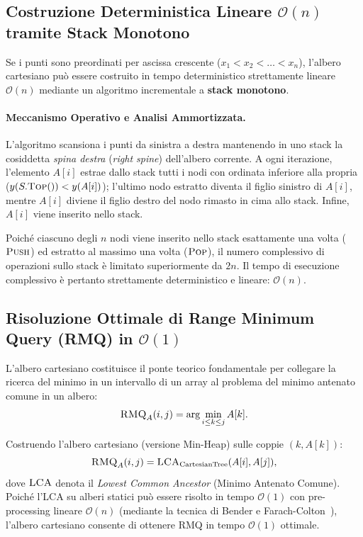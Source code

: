 \FloatBarrier
\subsection{Costruzione Deterministica Lineare $\mathcal{O}(n)$ tramite Stack Monotono}
Se i punti sono preordinati per ascissa crescente ($x_1 < x_2 < \dots < x_n$), l'albero cartesiano pu\`o essere costruito in tempo deterministico strettamente lineare $\mathcal{O}(n)$ mediante un algoritmo incrementale a \textbf{stack monotono}.

\paragraph{Meccanismo Operativo e Analisi Ammortizzata.}
L'algoritmo scansiona i punti da sinistra a destra mantenendo in uno stack la cosiddetta \textit{spina destra} (\textit{right spine}) dell'albero corrente. A ogni iterazione, l'elemento $A[i]$ estrae dallo stack tutti i nodi con ordinata inferiore alla propria ($y(S.\textsc{Top}()) < y(A[i])$); l'ultimo nodo estratto diventa il figlio sinistro di $A[i]$, mentre $A[i]$ diviene il figlio destro del nodo rimasto in cima allo stack. Infine, $A[i]$ viene inserito nello stack.

Poich\'e ciascuno degli $n$ nodi viene inserito nello stack esattamente una volta ($\textsc{Push}$) ed estratto al massimo una volta ($\textsc{Pop}$), il numero complessivo di operazioni sullo stack \`e limitato superiormente da $2n$. Il tempo di esecuzione complessivo \`e pertanto strettamente deterministico e lineare: $\mathcal{O}(n)$.

\FloatBarrier
\subsection{Risoluzione Ottimale di Range Minimum Query (RMQ) in $\mathcal{O}(1)$}
L'albero cartesiano costituisce il ponte teorico fondamentale per collegare la ricerca del minimo in un intervallo di un array al problema del minimo antenato comune in un albero:
\begin{equation}
  \textsc{RMQ}_A(i, j) = \arg\min_{i \le k \le j} A[k].
\end{equation}

Costruendo l'albero cartesiano (versione Min-Heap) sulle coppie $(k, A[k])$:
\begin{equation}
  \textsc{RMQ}_A(i, j) = \textsc{LCA}_{\text{CartesianTree}}(A[i], A[j]),
\end{equation}
dove $\textsc{LCA}$ denota il \textit{Lowest Common Ancestor} (Minimo Antenato Comune). Poich\'e l'LCA su alberi statici pu\`o essere risolto in tempo $\mathcal{O}(1)$ con pre-processing lineare $\mathcal{O}(n)$ (mediante la tecnica di Bender e Farach-Colton~\cite{bender2000}), l'albero cartesiano consente di ottenere RMQ in tempo $\mathcal{O}(1)$ ottimale.

